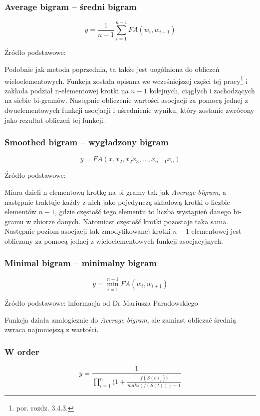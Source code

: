 \subsubsection{Average bigram -- średni bigram}
$$ y = \frac{1}{n-1} \sum^{n-1}_{i=1}FA(w_{i}, w_{i+1}) $$

Źródło podstawowe: \cite[str. 5]{generalization_patterns}
\par 
Podobnie jak metoda poprzednia, ta także jest uogólniona do obliczeń wieloelementowych.
Funkcja została opisana we wcześniejszej części tej pracy\footnote{por. rozdz. 3.4.3.} i zakłada podział n-elementowej krotki na \( n - 1 \) kolejnych, ciągłych i zachodzących na siebie bi-gramów.
Następnie obliczenie wartości asocjacji za pomocą jednej z dwuelementowych funkcji asocjacji i uśrednienie wyniku, który zostanie zwrócony jako rezultat obliczeń tej funkcji.

\subsubsection{Smoothed bigram -- wygładzony bigram}
$$ y = FA(x_{1}x_{2}, x_{2}x_{3}, ..., x_{n - 1}x_{n}) $$

Źródło podstawowe: \cite[str. 5]{generalization_patterns}
\par
Miara dzieli n-elementową krotkę na bi-gramy tak jak \emph{Average bigram}, a następnie traktuje każdy z nich jako pojedynczą składową krotki o liczbie elementów \( n -1 \), gdzie częstość tego elementu to liczba wystąpień danego bi-gramu w zbiorze danych.
Natomiast częstość krotki pozostaje taka sama.
Następnie poziom asocjacji tak zmodyfikowanej krotki \(n-1\)-elementowej jest obliczany za pomocą jednej z wieloelementowych funkcji asocjacyjnych.

\subsubsection{Minimal bigram -- minimalny bigram}
$$ y = \min^{n-1}_{i=1}FA(w_{i}, w_{i+1}) $$

Źródło podstawowe: informacja od Dr Mariusza Paradowskiego
\par
Funkcja działa analogicznie do \emph{Average bigram}, ale zamiast obliczać średnią zwraca najmniejszą z wartości.

\subsubsection{W order}
$$ y = \frac{1}{\prod_{i=1}^{n} (1 + \frac{f(S(t)_{i}))}{maks(f(S(t))) + 1}} $$

